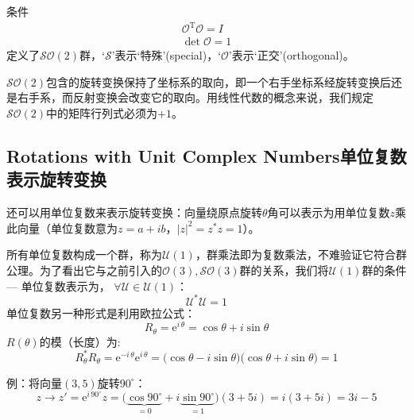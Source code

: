 条件
\begin{align}
\label{equ3.9}
\mathcal{O}^{\mathrm{T}} \mathcal{O} = I \\
\label{equ3.10}
\det \mathcal{O} = 1
\end{align}
定义了$\mathcal{SO}(2)$群，`$\mathcal{S}$'表示‘特殊’(special)，`$\mathcal{O}$'表示‘正交’(orthogonal)。

$\mathcal{SO}(2)$包含的旋转变换保持了坐标系的取向，即一个右手坐标系经旋转变换后还是右手系，而反射变换会改变它的取向。用线性代数的概念来说，我们规定$\mathcal{SO}(2)$中的矩阵行列式必须为$+1$。

\subsection[单位复数表示旋转变换]{Rotations with Unit Complex Numbers\quad 单位复数表示旋转变换}
\label{sec3.2.1}
还可以用单位复数来表示旋转变换：向量绕原点旋转$\theta$角可以表示为用单位复数$z$乘此向量（单位复数意为$z = a + ib$，$|z|^2 = z^* z = 1$）。

所有单位复数构成一个群，称为$\mathcal{U}(1)$，群乘法即为复数乘法，不难验证它符合群公理。为了看出它与之前引入的$\mathcal{O}(3), \mathcal{SO}(3)$群的关系，我们将$\mathcal{U}(1)$群的条件 --- 单位复数表示为， $\forall \mathcal{U} \in \mathcal{U}(1)$：
\begin{equation}
\label{equ3.11}
\mathcal{U}^* \mathcal{U} = 1
\end{equation}
单位复数另一种形式是利用欧拉公式：%
\begin{equation}
\label{equ3.12}
R_\theta = \mathrm{e}^{i\,\theta} = \cos \theta + i\sin \theta
\end{equation}
$R(\theta)$的模（长度）为:
\begin{equation}
\label{equ3.13}
R_\theta^* R_\theta = \mathrm{e}^{-i\,\theta} \mathrm{e}^{i\,\theta} = \big( \cos \theta - i \sin \theta  \big) \big( \cos \theta + i \sin \theta \big) = 1
\end{equation}


例：将向量$(3,  5)$旋转$90^\circ$：
\begin{equation}
\label{equ3.14}
z \rightarrow z' = \mathrm{e}^{i\, 90^\circ}z = \bigg( \underbrace{\cos 90^\circ}_{=0} + i\underbrace{\sin 90^\circ}_{=1} \bigg) (3 + 5i) = i(3 + 5i) = 3i - 5
\end{equation}

